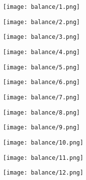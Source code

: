 \begin{figure}
  \hfill
  \begin{minipage}{0.325\textwidth}
    \centering
    \texttt{[image: balance/1.png]}
  \end{minipage}
  \begin{minipage}{0.325\textwidth}
    \centering
    \texttt{[image: balance/2.png]}
  \end{minipage}
  \begin{minipage}{0.325\textwidth}
    \centering
    \texttt{[image: balance/3.png]}
  \end{minipage}
  \vfill
  \hfill
  \begin{minipage}{0.325\textwidth}
    \centering
    \texttt{[image: balance/4.png]}
  \end{minipage}
  \begin{minipage}{0.325\textwidth}
    \centering
    \texttt{[image: balance/5.png]}
  \end{minipage}
  \begin{minipage}{0.325\textwidth}
    \centering
    \texttt{[image: balance/6.png]}
  \end{minipage}
  \vfill
  \hfill
  \begin{minipage}{0.325\textwidth}
    \centering
    \texttt{[image: balance/7.png]}
  \end{minipage}
  \begin{minipage}{0.325\textwidth}
    \centering
    \texttt{[image: balance/8.png]}
  \end{minipage}
  \begin{minipage}{0.325\textwidth}
    \centering
    \texttt{[image: balance/9.png]}
  \end{minipage}
  \vfill
  \hfill
  \begin{minipage}{0.325\textwidth}
    \centering
    \texttt{[image: balance/10.png]}
  \end{minipage}
  \begin{minipage}{0.325\textwidth}
    \centering
    \texttt{[image: balance/11.png]}
  \end{minipage}
  \begin{minipage}{0.325\textwidth}
    \centering
    \texttt{[image: balance/12.png]}
  \end{minipage}
  \vfill
  \hfill
  \begin{minipage}{0.325\textwidth}

\end{minipage}
\end{figure}
